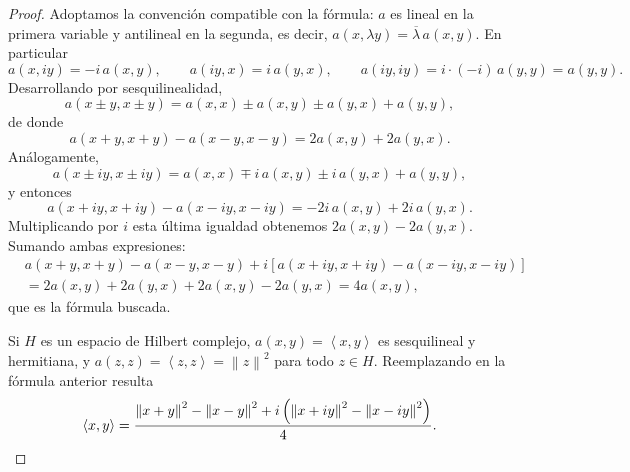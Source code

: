 \documentclass{article}
\theoremstyle{definition}
\newcommand{\norm}[1]{\left\lVert #1 \right\rVert}       %
\newcommand{\ip}[2]{\left\langle #1, #2 \right\rangle}   %
\begin{document}
\begin{proof}
	Adoptamos la convención compatible con la fórmula: \( a \) es lineal en la primera variable y antilineal en la segunda, es decir, \( a(x, \lambda y) = \overline{\lambda}\, a(x, y) \). En particular
	\[ a(x, iy) = -i\, a(x, y), \qquad a(iy, x) = i\, a(y, x), \qquad a(iy, iy) = i \cdot (-i)\, a(y, y) = a(y, y). \]
	Desarrollando por sesquilinealidad,
	\[ a(x \pm y, x \pm y) = a(x, x) \pm a(x, y) \pm a(y, x) + a(y, y), \]
	de donde
	\[ a(x+y, x+y) - a(x-y, x-y) = 2a(x, y) + 2a(y, x). \]
	Análogamente,
	\[ a(x \pm iy, x \pm iy) = a(x, x) \mp i\, a(x, y) \pm i\, a(y, x) + a(y, y), \]
	y entonces
	\[ a(x+iy, x+iy) - a(x-iy, x-iy) = -2i\, a(x, y) + 2i\, a(y, x). \]
	Multiplicando por \( i \) esta última igualdad obtenemos \( 2a(x, y) - 2a(y, x) \). Sumando ambas expresiones:
	\begin{align*}
		 & a(x+y, x+y) - a(x-y, x-y) + i \left[ a(x+iy, x+iy) - a(x-iy, x-iy) \right] \\
		 & = 2a(x, y) + 2a(y, x) + 2a(x, y) - 2a(y, x) = 4a(x, y),
	\end{align*}
	que es la fórmula buscada.

	Si \( H \) es un espacio de Hilbert complejo, \( a(x, y) = \ip{x}{y} \) es sesquilineal y hermitiana, y \( a(z, z) = \ip{z}{z} = \norm{z}^2 \) para todo \( z \in H \). Reemplazando en la fórmula anterior resulta
	\[ \ip{x}{y} = \frac{\norm{x+y}^2 - \norm{x-y}^2 + i \left( \norm{x+iy}^2 - \norm{x-iy}^2 \right)}{4}. \qedhere \]
\end{proof}

\vspace{0.5cm}
\end{document}
